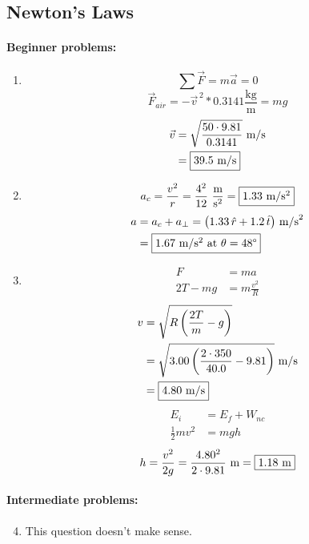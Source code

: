 \documentclass[12pt,letterpaper]{article}
\begin{document}
\begin{multicols}{2}
\section{Newton's Laws}

\paragraph{Beginner problems:}
\begin{enumerate}
\item
$$\sum \vec{F} = m\vec{a} = 0$$
$$\vec{F}_{air} = -\vec{v}^{\,2}*0.3141\frac{\text{kg}}{\text{m}} = mg$$
\[
\begin{aligned}
\vec{v} &= \sqrt{\frac{50\cdot 9.81}{0.3141}}\ \text{m\slash s}\\
        &= \fbox{39.5 m\slash s}
\end{aligned}
\]

\item
$$a_c = \frac{v^2}{r} = \frac{4^2}{12}\ \frac{\text{m}}{\text{s}^2} = \fbox{1.33 m\slash s$^2$}$$
\[
\begin{aligned}
a &= a_c + a_\perp = \left(1.33\,\hat{r} + 1.2\,\hat{t}\right)\,\text{m\slash s}^2\\
  &= \fbox{1.67 m\slash s$^2$ at $\theta = 48\degree$}
\end{aligned}
\]

\item \[
\begin{aligned}
F     &= ma\\
2T-mg &= m\frac{v^2}{R}
\end{aligned}
\] \[
\begin{aligned}
v &= \sqrt{R\left(\frac{2T}{m}-g\right)}\\
  &= \sqrt{3.00\left(\frac{2\cdot 350}{40.0}-9.81\right)}\ \text{m\slash s}\\
  &= \fbox{4.80 m\slash s}
\end{aligned}
\] \[
\begin{aligned}
            E_i &= E_f + W_{nc}\\
\frac{1}{2}mv^2 &= mgh
\end{aligned}
\]
$$h = \frac{v^2}{2g} = \frac{4.80^2}{2\cdot 9.81}\ \text{m} = \fbox{1.18 m}$$
\end{enumerate}

\paragraph{Intermediate problems:}
\begin{enumerate}
\setcounter{enumi}{3}
\item This question doesn't make sense.


\end{enumerate}
\end{multicols}
\end{document}
